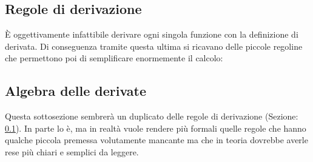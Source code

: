 \subsection{Regole di derivazione} \label{sec_regoleDerivazione}
È oggettivamente infattibile derivare ogni singola funzione con la definizione di derivata. Di conseguenza tramite questa ultima si ricavano delle piccole regoline che permettono poi di semplificare enormemente il calcolo:

\subsection{Algebra delle derivate} 
Questa sottosezione sembrerà un duplicato delle regole di derivazione (Sezione: \ref{sec_regoleDerivazione}). In parte lo è, ma in realtà vuole rendere più formali quelle regole che hanno qualche piccola premessa volutamente mancante ma che in teoria dovrebbe averle rese più chiari e semplici da leggere.\\

